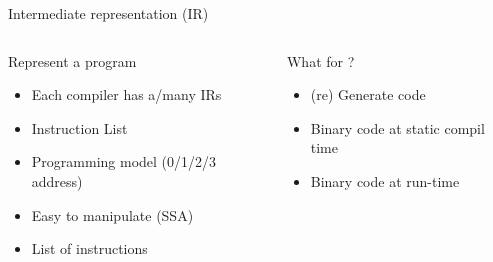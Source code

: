 %
\begin{Frame}{Intermediate representation (IR)}
  \begin{columns}[t]
    \begin{column}{5cm} %
      \begin{block}{Represent a program}
        \begin{itemize}
        \item Each compiler has a/many IRs
        \item Instruction List
        \item Programming model (0/1/2/3 address)
        \item Easy to manipulate (SSA)
        \item List of instructions
        \end{itemize}
      \end{block} 
    \end{column}
    
    \begin{column}{5cm} %
      \begin{block}{What for ?}
        \begin{itemize}
        \item (re) Generate code
        \item Binary code at static compil time
        \item Binary code at run-time
        \end{itemize}
      \end{block}   
    \end{column}
  \end{columns}  
\end{Frame}


